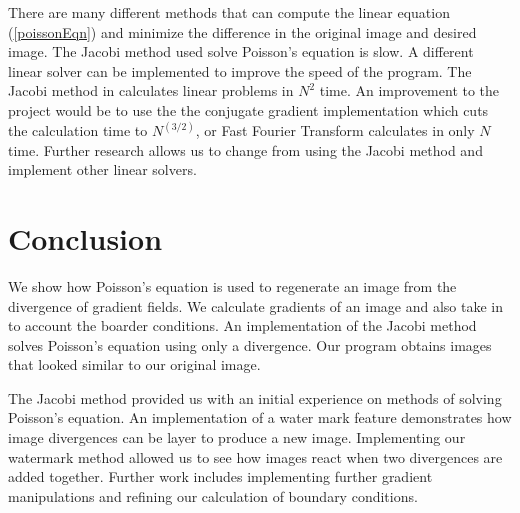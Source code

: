 \documentclass[10pt,twopage]{acmsiggraph}
\begin{document}
There are many different methods that can compute the linear equation (\ref{poissonEqn}) and minimize the difference in the original image and desired image. The Jacobi method used solve Poisson's equation is slow. A different linear solver can be implemented to improve the speed of the program. The Jacobi method in calculates linear problems in $N^2$ time. An improvement to the project would be to use the the conjugate gradient implementation which cuts the calculation time to $N^(3/2)$, or Fast Fourier Transform calculates in only $N$ time. Further research allows us to change from using the Jacobi method and implement other linear solvers.

\section{Conclusion}

We show how Poisson's equation is used to regenerate an image from the divergence of gradient fields. We calculate gradients of an image and also take in to account the boarder conditions. An implementation of the Jacobi method solves Poisson's equation using only a divergence. Our program obtains images that looked similar to our original image.

The Jacobi method provided us with an initial experience on methods of solving Poisson's equation. An implementation of a water mark feature demonstrates how image divergences can be layer to produce a new image. Implementing our watermark method allowed us to see how images react when two divergences are added together. Further work includes implementing further gradient manipulations and refining our calculation of boundary conditions.
\end{document}

